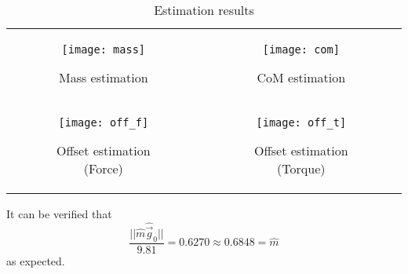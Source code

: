 \begin{table}[h]
  \begin{tabular}{cc}
    \begin{subfigure}{0.5\textwidth}
      \centering
      \texttt{[image: mass]}
      \caption{Mass estimation \label{fig:mass_estimation}}
    \end{subfigure}&
    \begin{subfigure}{0.5\textwidth}
      \centering
      \texttt{[image: com]}
      \caption{CoM estimation\label{fig:com_estimation}}
    \end{subfigure} \\
    \begin{subfigure}{0.5\textwidth}
      \centering
      \texttt{[image: off\_f]}
      \caption{Offset estimation (Force) \label{fig:off_f_estimation}}
    \end{subfigure}&
    \begin{subfigure}{0.5\textwidth}
      \centering
      \texttt{[image: off\_t]}
      \caption{Offset estimation (Torque) \label{fig:off_t_estimation}}
    \end{subfigure}
  \end{tabular}
  \caption*{Estimation results}
\end{table}
It can be verified that
\[
\frac{||\hat{m}\hat{\vec{g}}_0||}{9.81} = 0.6270 \approx 0.6848 = \hat{m}
\]
as expected.
\newpage
